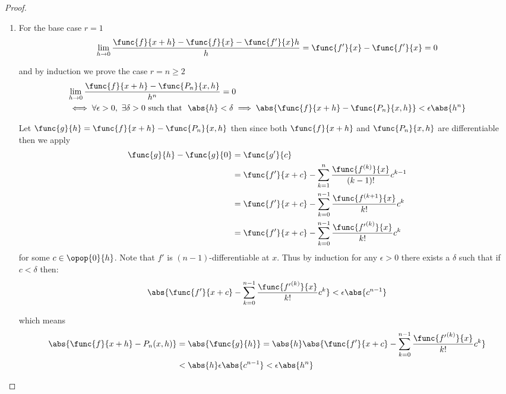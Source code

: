 \begin{proof}
\begin{enumerate}
\item
For the base case \(r = 1\)
\begin{align*}
    \lim_{h \to 0}{\dfrac{\func{f}{x+h} - \func{f}{x} -\func{f'}{x}h}{h}} = \func{f'}{x} - \func{f'}{x} = 0
\end{align*}

and by induction we prove the case \(r = n \geq 2\)
          \begin{align*}
               & \lim_{h \to 0}{\dfrac{\func{f}{x+h} - \func{P_n}{x,h}}{h^n}} = 0                                                                      \\
               & \iff \forall \epsilon >0, \ \exists \delta > 0\ \text{such that } \ \abs{h} < \delta \implies \abs{\func{f}{x+h} - \func{P_n}{x,h}}< \epsilon \abs{h^n}
          \end{align*}

          Let \(\func{g}{h} = \func{f}{x+h} - \func{P_n}{x,h}\) then since both \(\func{f}{x+h}\) and \(\func{P_n}{x,h}\) are differentiable then we apply 
          \begin{align*}
              \func{g}{h} - \func{g}{0} &= \func{g'}{c}                                                   \\
                          & = \func{f'}{x+c} - \sum_{k = 1}^{n} \dfrac{\func{ f^{(k)}}{x}}{(k-1)!}c^{k-1} \\
                          & =  \func{f'}{x+c} - \sum_{k = 0}^{n-1} \dfrac{\func{f^{(k+1}}{x}}{k!}c^{k}   \\
                          & =  \func{f'}{x+c} - \sum_{k = 0}^{n-1} \dfrac{\func{ {f'}^{(k)}}{x}}{k!}c^{k}
          \end{align*}
          for some \(c \in \opop{0}{h}\). Note that \(f'\) is \((n-1)\)-differentiable at \(x\). Thus by induction for any \(\epsilon > 0\) there exists a \(\delta\) such that if \(c < \delta \) then:
          \begin{equation*}
            \abs{\func{f'}{x+c} - \sum_{k = 0}^{n-1} \dfrac{\func{ {f'}^{(k)}}{x}}{k!}c^{k}} < \epsilon \abs{c^{n-1}}
          \end{equation*}

          which means
          \begin{align*}
              \abs{\func{f}{x+h} - P_n(x,h)} & = \abs{\func{g}{h}} = \abs{h} \abs{\func{f'}{x+c} - \sum_{k = 0}^{n-1} \dfrac{\func{ {f'}^{(k)}}{x}}{k!}c^{k}}\\
                                  & < \abs{h} \epsilon \abs{c^{n-1}}< \epsilon \abs{h^n}
          \end{align*}


\end{enumerate}
\end{proof}

